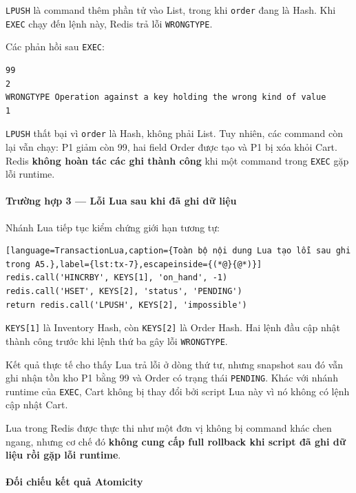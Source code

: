\texttt{LPUSH} là command thêm phần tử vào List, trong khi \texttt{order} đang là Hash. Khi \texttt{EXEC} chạy đến lệnh này, Redis trả lỗi \texttt{WRONGTYPE}.

Các phản hồi sau \texttt{EXEC}:

\reportblockspace{72pt}
\begingroup
{}\label{result:tx-5}
\nopagebreak[4]
\begin{Verbatim}
99
2
WRONGTYPE Operation against a key holding the wrong kind of value
1
\end{Verbatim}
\endgroup\par\smallskip
\texttt{LPUSH} thất bại vì \texttt{order} là Hash, không phải List. Tuy nhiên, các command còn lại vẫn chạy: P1 giảm còn 99, hai field Order được tạo và P1 bị xóa khỏi Cart. Redis \textbf{không hoàn tác các ghi thành công} khi một command trong \texttt{EXEC} gặp lỗi runtime.

\paragraph*{Trường hợp 3 — Lỗi Lua sau khi đã ghi dữ liệu}

Nhánh Lua tiếp tục kiểm chứng giới hạn tương tự:

\reportblockspace{72pt}
\begin{lstlisting}[language=TransactionLua,caption={Toàn bộ nội dung Lua tạo lỗi sau ghi trong A5.},label={lst:tx-7},escapeinside={(*@}{@*)}]
redis.call('HINCRBY', KEYS[1], 'on_hand', -1)
redis.call('HSET', KEYS[2], 'status', 'PENDING')
return redis.call('LPUSH', KEYS[2], 'impossible')
\end{lstlisting}

\texttt{KEYS[1]} là Inventory Hash, còn \texttt{KEYS[2]} là Order Hash. Hai lệnh đầu cập nhật thành công trước khi lệnh thứ ba gây lỗi \texttt{WRONGTYPE}.

Kết quả thực tế cho thấy Lua trả lỗi ở dòng thứ tư, nhưng snapshot sau đó vẫn ghi nhận tồn kho P1 bằng 99 và Order có trạng thái \texttt{PENDING}. Khác với nhánh runtime của \texttt{EXEC}, Cart không bị thay đổi bởi script Lua này vì nó không có lệnh cập nhật Cart.

Lua trong Redis được thực thi như một đơn vị không bị command khác chen ngang, nhưng cơ chế đó \textbf{không cung cấp full rollback khi script đã ghi dữ liệu rồi gặp lỗi runtime}.

\paragraph*{Đối chiếu kết quả Atomicity}

